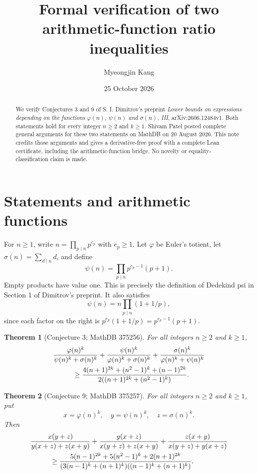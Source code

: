 \documentclass[11pt]{article}
\title{Formal verification of two arithmetic-function ratio inequalities}
\author{Myeongjin Kang}
\date{25 October 2026}
\newtheorem{theorem}{Theorem}
\begin{document}
\maketitle
\begin{abstract}
We verify Conjectures 3 and 9 of S. I. Dimitrov's preprint
\emph{Lower bounds on expressions depending on the functions
$\varphi(n)$, $\psi(n)$ and $\sigma(n)$, III}, arXiv:2606.12484v1.
Both statements hold for every integer $n\geq2$ and $k\geq1$.
Shivam Patel posted complete general arguments for these two statements
on MathDB on 20 August 2026. This note credits those arguments and gives
a derivative-free proof with a complete Lean certificate, including the
arithmetic-function bridge. No novelty or equality-classification claim
is made.
\end{abstract}

\section{Statements and arithmetic functions}
For $n\geq1$, write $n=\prod_{p\mid n}p^{e_p}$ with $e_p\geq1$.
Let $\varphi$ be Euler's totient, let $\sigma(n)=\sum_{d\mid n}d$, and define
\[
 \psi(n)=\prod_{p\mid n}p^{e_p-1}(p+1).
\]
Empty products have value one. This is precisely the definition of
Dedekind psi in Section 1 of Dimitrov's preprint. It also satisfies
\[
 \psi(n)=n\prod_{p\mid n}(1+1/p),
\]
since each factor on the right is
$p^{e_p}(1+1/p)=p^{e_p-1}(p+1)$.

\begin{theorem}[Conjecture 3; MathDB 375256]\label{thm:simple}
For all integers $n\geq2$ and $k\geq1$,
\begin{align*}
&\frac{\varphi(n)^k}{\psi(n)^k+\sigma(n)^k}
+\frac{\psi(n)^k}{\varphi(n)^k+\sigma(n)^k}
+\frac{\sigma(n)^k}{\varphi(n)^k+\psi(n)^k}\\
&\hspace{10mm}\geq
\frac{4(n+1)^{2k}+(n^2-1)^k+(n-1)^{2k}}
 {2((n+1)^{2k}+(n^2-1)^k)}.
\end{align*}
\end{theorem}

\begin{theorem}[Conjecture 9; MathDB 375257]\label{thm:mixed}
For all integers $n\geq2$ and $k\geq1$, put
\[
x=\varphi(n)^k,\quad y=\psi(n)^k,\quad z=\sigma(n)^k.
\]
Then
\begin{align*}
&\frac{x(y+z)}{y(x+z)+z(x+y)}
 +\frac{y(x+z)}{x(y+z)+z(x+y)}
 +\frac{z(x+y)}{x(y+z)+y(x+z)}\\
&\hspace{10mm}\geq
\frac{5(n-1)^{2k}+5(n^2-1)^k+2(n+1)^{2k}}
 {(3(n-1)^k+(n+1)^k)((n-1)^k+(n+1)^k)}.
\end{align*}
\end{theorem}
\end{document}
